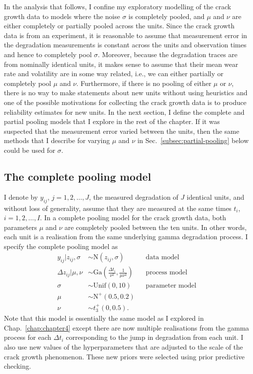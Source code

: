 In the analysis that follows, I confine my exploratory modelling of the crack growth data to models where the noise $\sigma$ is completely pooled, and $\mu$ and $\nu$ are either completely or partially pooled across the units. Since the crack growth data is from an experiment, it is reasonable to assume that measurement error in the degradation measurements is constant across the units and observation times and hence to completely pool $\sigma$. Moreover, because the degradation traces are from nominally identical units, it makes sense to assume that their mean wear rate and volatility are in some way related, i.e., we can either partially or completely pool $\mu$ and $\nu$. Furthermore, if there is no pooling of either $\mu$ or $\nu$, there is no way to make statements about new units without using heuristics and one of the possible motivations for collecting the crack growth data is to produce reliability estimates for new units. In the next section, I define the complete and partial pooling models that I explore in the rest of the chapter. If it was suspected that the measurement error varied between the units, then the same methods that I describe for varying $\mu$ and $\nu$ in Sec.~\ref{subsec:partial-pooling} below could be used for $\sigma$.

\subsection{The complete pooling model}
\label{subsec:complete-pooling}

I denote by $y_{ij}$, $j = 1, 2, \ldots, J$, the measured degradation of $J$ identical units, and without loss of generality, assume that they are measured at the same times $t_i$, $i = 1, 2, \ldots, I$. In a complete pooling model for the crack growth data, both parameters $\mu$ and $\nu$ are completely pooled between the ten units. In other words, each unit is a realisation from the same underlying gamma degradation process. I specify the complete pooling model as 
\begin{align*} 
   y_{ij}|z_{ij}, \sigma & \sim \mbox{N}(z_{ij}, \sigma) && \mbox{data model} \\
   \Delta z_{ij}|\mu, \nu & \sim \mbox{Ga} \left( \frac{\Delta t_{i}}{\nu^2}, \frac{1}{\mu \nu^2} \right) && \mbox{process model} \\
   \sigma & \sim \mbox{Unif}(0, 10) && \mbox{parameter model} \\
   \mu & \sim \mbox{N}^{+}(0.5, 0.2) \\
   \nu & \sim t^{+}_3(0, 0.5).
\end{align*}
Note that this model is essentially the same model as I explored in Chap.~\ref{chap:chapter4} except there are now multiple realisations from the gamma process for each $\Delta t_{i}$ corresponding to the jump in degradation from each unit. I also use new values of the hyperparameters that are adjusted to the scale of the crack growth phenomenon. These new priors were selected using prior predictive checking.

